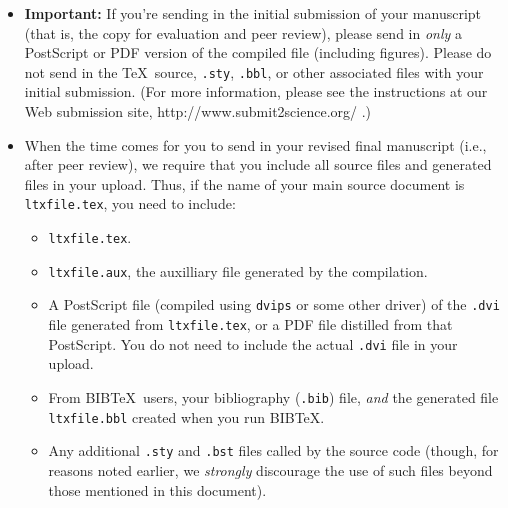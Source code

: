 \documentclass[12pt]{article}
\begin{document}
\begin{itemize}
\item {\bf Important:} If you're sending in the initial submission of
  your manuscript (that is, the copy for evaluation and peer review),
  please send in {\it only\/} a PostScript or PDF version of the
  compiled file (including figures).  Please do not send in the \TeX\ 
  source, \texttt{.sty}, \texttt{.bbl}, or other associated files with
  your initial submission.  (For more information, please see the
  instructions at our Web submission site,
  http://www.submit2science.org/ .)
\item When the time comes for you to send in your revised final
  manuscript (i.e., after peer review), we require that you include
  all source files and generated files in your upload.  Thus, if the
  name of your main source document is \texttt{ltxfile.tex}, you
  need to include:
\begin{itemize}
\item \texttt{ltxfile.tex}.
\item \texttt{ltxfile.aux}, the auxilliary file generated by the
  compilation.
\item A PostScript file (compiled using \texttt{dvips} or some other
  driver) of the \texttt{.dvi} file generated from
  \texttt{ltxfile.tex}, or a PDF file distilled from that
  PostScript.  You do not need to include the actual \texttt{.dvi}
  file in your upload.
\item From B{\small{IB}}\TeX\ users, your bibliography (\texttt{.bib})
  file, {\it and\/} the generated file \texttt{ltxfile.bbl} created
  when you run B{\small{IB}}\TeX.
\item Any additional \texttt{.sty} and \texttt{.bst} files called by
  the source code (though, for reasons noted earlier, we {\it
    strongly\/} discourage the use of such files beyond those
  mentioned in this document).
\end{itemize}
\end{itemize}









\end{document}
